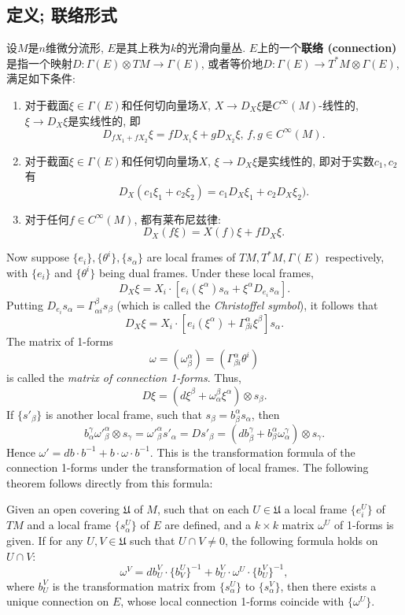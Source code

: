 
\subsection{定义; 联络形式}
设$M$是$n$维微分流形, $E$是其上秩为$k$的光滑向量丛. $E$上的一个\textbf{联络 (connection) }是指一个映射$D:\Gamma(E)\otimes TM\to\Gamma(E)$, 或者等价地$D:\Gamma(E)\to T^*M\otimes\Gamma(E)$, 满足如下条件:

\begin{enumerate}
\item 对于截面$\xi\in\Gamma(E)$和任何切向量场$X$, $X\to D_X\xi$是$C^\infty(M)$-线性的, $\xi\to D_X\xi$是实线性的, 即
$$
D_{fX_1+fX_2}\xi=fD_{X_1}\xi+gD_{X_2}\xi,\,f,g\in C^\infty(M).
$$
\item 对于截面$\xi\in\Gamma(E)$和任何切向量场$X$, $\xi\to D_X\xi$是实线性的, 即对于实数$c_1,c_2$有
$$
D_X(c_1\xi_1+c_2\xi_2)=c_1D_X\xi_1+c_2D_X\xi_2).
$$
\item 对于任何$f\in C^\infty(M)$, 都有莱布尼兹律:
$$
D_X(f\xi)=X(f)\xi+fD_X\xi.
$$
\end{enumerate}
Now suppose $\{e_i\},\{\theta^i\},\{s_\alpha\}$ are local frames of $TM,T^*M,\Gamma(E)$ respectively, with $\{e_i\}$ and $\{\theta^i\}$ being dual frames. Under these local frames,
$$D_X\xi=X_i\cdot\left[e_i(\xi^\alpha)s_\alpha+\xi^\alpha D_{e_i}s_\alpha\right].$$
Putting $D_{e_i}s_\alpha=\Gamma_{\alpha i}^\beta s_\beta$ (which is called the \emph{Christoffel symbol}), it follows that
$$D_X\xi=X_i\cdot\left[e_i(\xi^\alpha)+\Gamma_{\beta i}^\alpha\xi^\beta \right]s_\alpha.$$
The matrix of 1-forms
$$\omega=(\omega_\beta^\alpha)=(\Gamma_{\beta i}^\alpha\theta^i)$$
is called the \emph{matrix of connection 1-forms}. Thus,
$$D\xi=(d\xi^\beta+\omega_\alpha^\beta\xi^\alpha)\otimes s_\beta.$$
If $\{s'_\beta\}$ is another local frame, such that $s_\beta=b_\beta^\alpha s_\alpha$, then
$$b_\alpha^\gamma{\omega'}_{\beta}^{\alpha}\otimes s_\gamma={\omega'}_{\beta}^{\alpha}s'_\alpha=Ds'_\beta=(db_\beta^\gamma+b_\beta^\alpha\omega_\alpha^\gamma)\otimes s_\gamma.$$
Hence $\omega'=db\cdot b^{-1}+b\cdot\omega\cdot b^{-1}$. This is the transformation formula of the connection 1-forms under the transformation of local frames. The following theorem follows directly from this formula:

\begin{theorem}{}
Given an open covering $\mathfrak{U}$ of $M$, such that on each $U\in\mathfrak{U}$ a local frame $\{e^U_i\}$ of $TM$ and a local frame $\{s^U_\alpha\}$ of $E$ are defined, and a $k\times k$ matrix $\omega^U$ of 1-forms is given. If for any $U,V\in\mathfrak{U}$ such that $U\cap V\neq0$, the following formula holds on $U\cap V$:
$$\omega^V=db^V_U\cdot \{b_V^U\}^{-1}+b^V_U\cdot\omega^U\cdot \{b^V_U\}^{-1},$$
where $b^V_U$ is the transformation matrix from $\{s^U_\alpha\}$ to $\{s^V_\alpha\}$, then there exists a unique connection on $E$, whose local connection 1-forms coincide with $\{\omega^U\}$.
\end{theorem}

